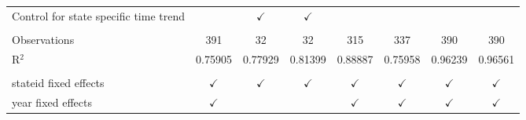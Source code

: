\begin{table}[htbp]
\begin{tabular}{lccccccc}
      Control for state specific time trend         &                          & $\checkmark$                        & $\checkmark$                    &                                                                   &                                                              &                                      & \\  
       \\
      Observations                                  & 391                      & 32                                  & 32                              & 315                                                               & 337                                                          & 390                                  & 390\\  
      R$^2$                                         & 0.75905                  & 0.77929                             & 0.81399                         & 0.88887                                                           & 0.75958                                                      & 0.96239                              & 0.96561\\  
       \\
      stateid fixed effects                         & $\checkmark$             & $\checkmark$                        & $\checkmark$                    & $\checkmark$                                                      & $\checkmark$                                                 & $\checkmark$                         & $\checkmark$\\   
      year fixed effects                            & $\checkmark$             &                                     &                                 & $\checkmark$                                                      & $\checkmark$                                                 & $\checkmark$                         & $\checkmark$\\   
      \bottomrule
   \end{tabular}
\end{table}


